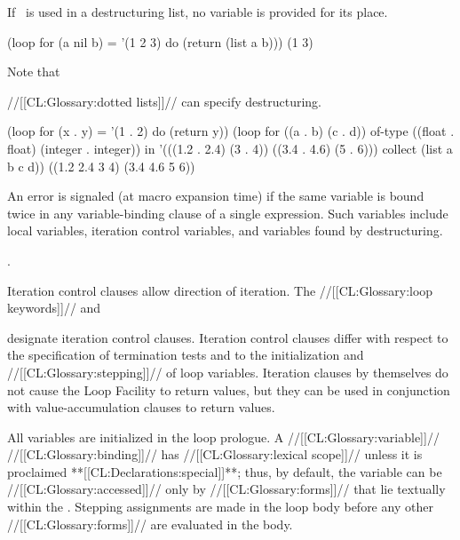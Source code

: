  
 
If \nil\ is used in a destructuring list, no variable is provided for
its place.
 
\code
 (loop for (a nil b) = '(1 2 3)
       do (return (list a b)))
\EV (1 3)
\endcode
 
Note that 


//[[CL:Glossary:dotted lists]]//
can specify destructuring.
 
\code
 (loop for (x . y) = '(1 . 2)
       do (return y))
 (loop for ((a . b) (c . d)) of-type ((float . float) (integer . integer)) in
       '(((1.2 . 2.4) (3 . 4)) ((3.4 . 4.6) (5 . 6)))
       collect (list a b c d))
\EV ((1.2 2.4 3 4) (3.4 4.6 5 6))
\endcode
 
An error  is signaled (at macro expansion time)
if the same variable is bound twice in any variable-binding
clause of a single  expression.  Such variables include
local variables, iteration control variables, and variables found by
destructuring.

\endsubsubsection%


\Seesection\TraversalRules.


\endsubsubsection%

\endsubsection%

 

Iteration control clauses allow direction of  iteration.
The //[[CL:Glossary:loop keywords]]//  and 

designate iteration control clauses.
Iteration control clauses differ with respect to the specification of
termination tests and to the initialization and //[[CL:Glossary:stepping]]//
of loop variables.  Iteration clauses by themselves
do not cause the Loop Facility to return values, but they
can be used in conjunction with value-accumulation clauses to
return values.  
 
All variables are initialized in the loop prologue.  
A //[[CL:Glossary:variable]]// //[[CL:Glossary:binding]]// has //[[CL:Glossary:lexical scope]]//
unless it is proclaimed **[[CL:Declarations:special]]**;
thus, by default, the variable can be //[[CL:Glossary:accessed]]// only by //[[CL:Glossary:forms]]// 
that lie textually within the .
Stepping assignments are made in the loop body before any other //[[CL:Glossary:forms]]//
are evaluated in the body.  
 
